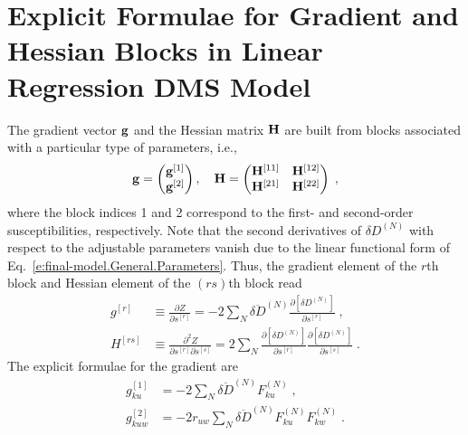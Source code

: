 \documentclass[aip,amsmath,amssymb,reprint,floatfix]{revtex4-1}
\begin{document}
\section{\label{a:blocks} Explicit Formulae for Gradient and Hessian Blocks in Linear Regression DMS Model}

The gradient vector ${\bf g}$ and the Hessian matrix ${\bf H}$ 
are built from blocks associated with a particular type of parameters, i.e.,
%
\begin{equation}\label{e:Newton.gH}
 {\bf g} = 
\begin{pmatrix}
{\bf g}^{[1]} \\ 
{\bf g}^{[2]} 
\end{pmatrix} ,\quad
 {\bf H} = 
\begin{pmatrix}
{\bf H}^{[11]} & {\bf H}^{[12]}  \\ 
{\bf H}^{[21]} & {\bf H}^{[22]}  
\end{pmatrix} \;,
\end{equation}
%
where the block indices 1 and 2 correspond to the first\hyp{} and second\hyp{}order susceptibilities, respectively.
Note that the second derivatives of $\delta D^{(N)}$ 
with respect to the adjustable parameters vanish
due to the linear functional form of Eq.~\eqref{e:final-model.General.Parameters}.
Thus, the gradient element of the $r$th block and Hessian element of the $(rs)$th block read
%
\begin{subequations}
 \begin{align}
  g^{[r ]}    &\equiv \frac{\partial   Z}{\partial s^{[r]}} 
     =-2\sum_N \overline{\delta D}^{(N)}
               \frac{\partial   \left[ \delta D^{(N)} \right]}{\partial s^{[r]}} \;,\\
  H^{[rs]} &\equiv \frac{\partial^2 Z}{\partial s^{[r]} \partial s^{[s]}}  
     = 2\sum_N 
        \frac{\partial   \left[ \delta D^{(N)} \right]}{\partial s^{[r]}}
        \frac{\partial   \left[ \delta D^{(N)} \right]}{\partial s^{[s]}} \;.
 \end{align}
\end{subequations}
%
The explicit formulae for the gradient are
%
\begin{subequations}
 \begin{align}
  g^{[1]}_{ku} &=-2\sum_N \overline{\delta D}^{(N)} F^{(N)}_{ku} \;,\\
  g^{[2]}_{kuw} &=-2r_{uw} \sum_N \overline{\delta D}^{(N)} F^{(N)}_{ku} F^{(N)}_{kw} \;.
 \end{align}
\end{subequations}
%
\end{document}
